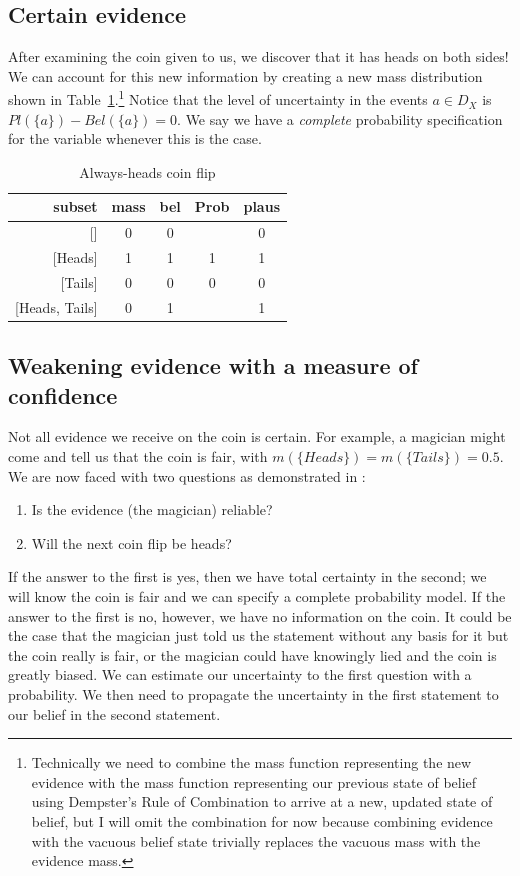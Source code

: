 \documentclass[letterpaper]{article}
\begin{document}
\subsection{Certain evidence}
After examining the coin given to us, we discover that it has heads on both sides!  We can account for this new information by creating a new mass distribution shown in Table~\ref{tab:CoinFlipAllHeads}.\footnote{Technically we need to combine the mass function representing the new evidence with the mass function representing our previous state of belief using Dempster's Rule of Combination to arrive at a new, updated state of belief, but I will omit the combination for now because combining evidence with the vacuous belief state trivially replaces the vacuous mass with the evidence mass.}
Notice that the level of uncertainty in the events $a \in D_X$ is $Pl(\{a\})-Bel(\{a\})=0$.  We say we have a \textit{complete} probability specification for the variable whenever this is the case.  

\begin{table}[htbp]
\centering
\caption{Always-heads coin flip}
\begin{tabular}{rcccc}
\toprule
                subset&mass &bel  &Prob &plaus\\
\midrule
                    {[]}&0    &0    &     &0    \\
               {[Heads]}&1    &1    &1    &1    \\
               {[Tails]}&0    &0    &0    &0    \\
        {[Heads, Tails]}&0    &1    &     &1    \\
\bottomrule
\end{tabular}
\label{tab:CoinFlipAllHeads}
\end{table}

\subsection{Weakening evidence with a measure of confidence}
Not all evidence we receive on the coin is certain.  For example, a magician might come and tell us that the coin is fair, with $m(\{Heads\})=m(\{Tails\})=0.5$.  We are now faced with two questions as demonstrated in \cite{Shafer1990}:
\begin{enumerate}
\item Is the evidence (the magician) reliable?
\item Will the next coin flip be heads?
\end{enumerate}
If the answer to the first is yes, then we have total certainty in the second; we will know the coin is fair and we can specify a complete probability model.  If the answer to the first is no, however, we have no information on the coin.  It could be the case that the magician just told us the statement without any basis for it but the coin really is fair, or the magician could have knowingly lied and the coin is greatly biased.  We can estimate our uncertainty to the first question with a probability.  We then need to propagate the uncertainty in the first statement to our belief in the second statement.
\end{document}
